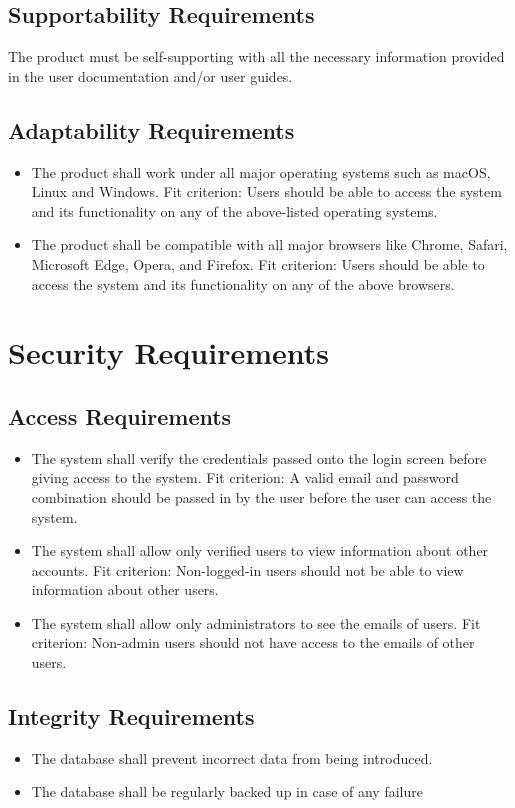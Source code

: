 \documentclass[12pt]{article}
\begin{document}
\subsection{Supportability Requirements}
The product must be self-supporting with all the necessary information provided in the user documentation and/or user guides.

\subsection{Adaptability Requirements}
\begin{itemize}
    \item The product shall work under all major operating systems such as macOS, Linux and Windows. \hfill \break
    Fit criterion: Users should be able to access the system and its functionality on any of the above-listed operating systems.
    \item The product shall be compatible with all major browsers like Chrome, Safari, Microsoft Edge, Opera, and Firefox. \hfill \break
    Fit criterion: Users should be able to access the system and its functionality on any of the above browsers.
\end{itemize}


\section{Security Requirements}
\subsection{Access Requirements}
\begin{itemize}
    \item The system shall verify the credentials passed onto the login screen before giving access to the system. \hfill \break
    Fit criterion: A valid email and password combination should be passed in by the user before the user can access the system.
    \item The system shall allow only verified users to view information about other accounts. \hfill \break
    Fit criterion: Non-logged-in users should not be able to view information about other users.
    \item The system shall allow only administrators to see the emails of users. \hfill \break
    Fit criterion: Non-admin users should not have access to the emails of other users.
\end{itemize}

\subsection{Integrity Requirements}
\begin{itemize}
    \item The database shall prevent incorrect data from being introduced.
    \item The database shall be regularly backed up in case of any failure
\end{itemize}
\end{document}
